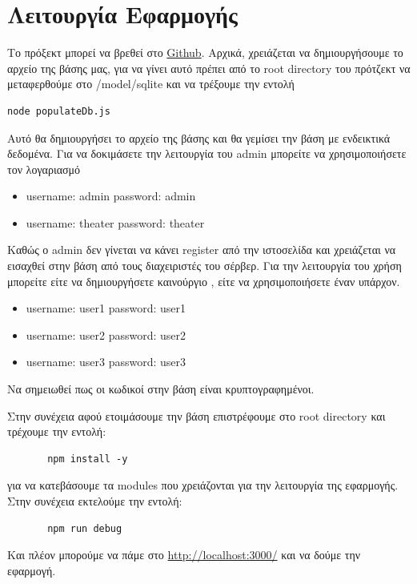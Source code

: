 \documentclass{acmart}
\begin{document}
\section{Λειτουργία Εφαρμογής}
Το πρόξεκτ μπορεί να βρεθεί στο \href{https://github.com/KonstantoJr/web_dev_project}{Github}.
Αρχικά, χρειάζεται να δημιουργήσουμε το αρχείο της βάσης μας, για να γίνει αυτό πρέπει από το root directory
του πρότζεκτ να μεταφερθούμε στο /model/sqlite και να τρέξουμε την εντολή 
\begin{lstlisting}
node populateDb.js 
\end{lstlisting}
Αυτό θα δημιουργήσει το αρχείο της βάσης και θα γεμίσει την βάση με ενδεικτικά δεδομένα.
Για να δοκιμάσετε την λειτουργία του admin μπορείτε να χρησιμοποιήσετε τον λογαριασμό 
\begin{itemize}
       \item username: admin password: admin
       \item username: theater password: theater
\end{itemize}
Καθώς ο admin δεν γίνεται να κάνει register από την ιστοσελίδα και χρειάζεται να εισαχθεί στην βάση από τους 
διαχειριστές του σέρβερ.
Για την λειτουργία του χρήση μπορείτε είτε να δημιουργήσετε καινούργιο , είτε να χρησιμοποιήσετε έναν υπάρχον.
\begin{itemize}
       \item username: user1 password: user1
       \item username: user2 password: user2
       \item username: user3 password: user3     
\end{itemize}
Να σημειωθεί πως οι κωδικοί στην βάση είναι κρυπτογραφημένοι.

Στην συνέχεια αφού ετοιμάσουμε την βάση επιστρέφουμε στο root directory και τρέχουμε την εντολή:
\begin{lstlisting}
       npm install -y 
\end{lstlisting}
για να κατεβάσουμε τα modules που χρειάζονται για την λειτουργία της εφαρμογής.
Στην συνέχεια εκτελούμε την εντολή:
\begin{lstlisting}
       npm run debug
\end{lstlisting}
Και πλέον μπορούμε να πάμε στο \url{http://localhost:3000/} και να δούμε την εφαρμογή.
\end{document}
